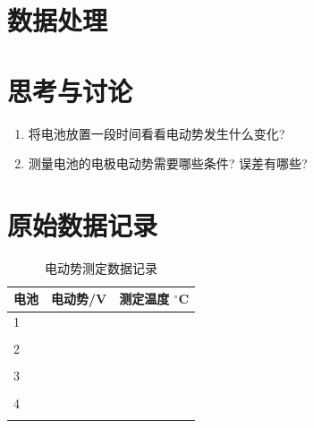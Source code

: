 \documentclass[a4paper]{article}
\begin{document}
\newpage
\section{数据处理}

\newpage
\section{思考与讨论}
\begin{enumerate}
	\item 将电池放置一段时间看看电动势发生什么变化?
	\item 测量电池的电极电动势需要哪些条件? 误差有哪些?
\end{enumerate}
\newpage
\section{原始数据记录}
\begin{table}[H]
	\caption{电动势测定数据记录}
	\begin{center}
		\begin{tabular}{l|l|l}
			\hline
			电池\quad\quad& 电动势/V \quad\quad\quad\quad& 测定温度 $^\circ$C\quad\quad\\
			\hline
			1 &	&	\\
			&	&	\\
			\hline
			2 &	&	\\
			&	&	\\
			\hline
			3 &	&	\\
			&	&	\\
			\hline
			4 &	&	\\
			&	&	\\
			\hline
		 \end{tabular}
	\end{center}
\end{table}
\end{document}

